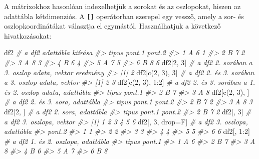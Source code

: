 \documentclass[
]{book}
\newenvironment{Shaded}{\begin{snugshade}}{\end{snugshade}}
\newcommand{\CommentTok}[1]{\textcolor[rgb]{0.56,0.35,0.01}{\textit{#1}}}
\newcommand{\DecValTok}[1]{\textcolor[rgb]{0.00,0.00,0.81}{#1}}
\newcommand{\FunctionTok}[1]{\textcolor[rgb]{0.00,0.00,0.00}{#1}}
\newcommand{\NormalTok}[1]{#1}
\newcommand{\OtherTok}[1]{\textcolor[rgb]{0.56,0.35,0.01}{#1}}
\newcommand{\SpecialCharTok}[1]{\textcolor[rgb]{0.00,0.00,0.00}{#1}}
\begin{document}
A mátrixokhoz hasonlóan indexelhetjük a sorokat és az oszlopokat, hiszen az adattábla kétdimenziós. A \texttt{{[}{]}} operátorban szerepel egy vessző, amely a sor- és oszlopkoordinátákat választja el egymástól. Használhatjuk a következő hivatkozásokat:

\begin{Shaded}
\begin{Highlighting}[]
\NormalTok{df2               }\CommentTok{\# a df2 adattábla kiírása}
\CommentTok{\#\textgreater{}   tipus pont.1 pont.2}
\CommentTok{\#\textgreater{} 1     A      6      1}
\CommentTok{\#\textgreater{} 2     B      7      2}
\CommentTok{\#\textgreater{} 3     A      8      3}
\CommentTok{\#\textgreater{} 4     B      6      4}
\CommentTok{\#\textgreater{} 5     A      7      5}
\CommentTok{\#\textgreater{} 6     B      8      6}
\NormalTok{df2[}\DecValTok{2}\NormalTok{, }\DecValTok{3}\NormalTok{]         }\CommentTok{\# a df2 2. sorában a 3. oszlop adata, vektor eredmény}
\CommentTok{\#\textgreater{} [1] 2}
\NormalTok{df2[}\FunctionTok{c}\NormalTok{(}\DecValTok{2}\NormalTok{, }\DecValTok{3}\NormalTok{), }\DecValTok{3}\NormalTok{]   }\CommentTok{\# a df2 2. és 3. sorában a 3. oszlop adata, vektor}
\CommentTok{\#\textgreater{} [1] 2 3}
\NormalTok{df2[}\FunctionTok{c}\NormalTok{(}\DecValTok{2}\NormalTok{, }\DecValTok{3}\NormalTok{), }\DecValTok{1}\SpecialCharTok{:}\DecValTok{2}\NormalTok{] }\CommentTok{\# a df2 2. és 3. sorában a 1. és 2. oszlop adata, adattábla}
\CommentTok{\#\textgreater{}   tipus pont.1}
\CommentTok{\#\textgreater{} 2     B      7}
\CommentTok{\#\textgreater{} 3     A      8}
\NormalTok{df2[}\FunctionTok{c}\NormalTok{(}\DecValTok{2}\NormalTok{, }\DecValTok{3}\NormalTok{), ]    }\CommentTok{\# a df2 2. és 3. sora, adattábla}
\CommentTok{\#\textgreater{}   tipus pont.1 pont.2}
\CommentTok{\#\textgreater{} 2     B      7      2}
\CommentTok{\#\textgreater{} 3     A      8      3}
\NormalTok{df2[}\DecValTok{2}\NormalTok{, ]          }\CommentTok{\# a df2 2. sora, adattábla}
\CommentTok{\#\textgreater{}   tipus pont.1 pont.2}
\CommentTok{\#\textgreater{} 2     B      7      2}
\NormalTok{df2[, }\DecValTok{3}\NormalTok{]          }\CommentTok{\# a df2 3. oszlopa, vektor}
\CommentTok{\#\textgreater{} [1] 1 2 3 4 5 6}
\NormalTok{df2[, }\DecValTok{3}\NormalTok{, drop}\OtherTok{=}\NormalTok{F]  }\CommentTok{\# a df2 3. oszlopa, adattábla}
\CommentTok{\#\textgreater{}   pont.2}
\CommentTok{\#\textgreater{} 1      1}
\CommentTok{\#\textgreater{} 2      2}
\CommentTok{\#\textgreater{} 3      3}
\CommentTok{\#\textgreater{} 4      4}
\CommentTok{\#\textgreater{} 5      5}
\CommentTok{\#\textgreater{} 6      6}
\NormalTok{df2[, }\DecValTok{1}\SpecialCharTok{:}\DecValTok{2}\NormalTok{]        }\CommentTok{\# a df2 1. és 2. oszlopa, adattábla}
\CommentTok{\#\textgreater{}   tipus pont.1}
\CommentTok{\#\textgreater{} 1     A      6}
\CommentTok{\#\textgreater{} 2     B      7}
\CommentTok{\#\textgreater{} 3     A      8}
\CommentTok{\#\textgreater{} 4     B      6}
\CommentTok{\#\textgreater{} 5     A      7}
\CommentTok{\#\textgreater{} 6     B      8}
\end{Highlighting}
\end{Shaded}
\end{document}
